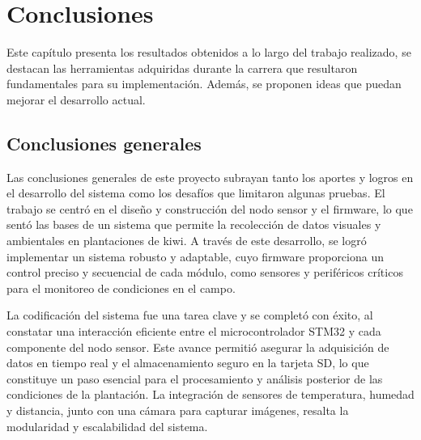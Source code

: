 
\chapter{Conclusiones} %

\label{Chapter5} %

Este capítulo presenta los resultados obtenidos a lo largo del trabajo realizado, se destacan las herramientas adquiridas durante la carrera que resultaron fundamentales para su implementación. Además, se proponen ideas que puedan mejorar el desarrollo actual.



\section{Conclusiones generales }

Las conclusiones generales de este proyecto subrayan tanto los aportes y logros en el desarrollo del sistema como los desafíos que limitaron algunas pruebas. El trabajo se centró en el diseño y construcción del nodo sensor y el firmware, lo que sentó las bases de un sistema que permite la recolección de datos visuales y ambientales en plantaciones de kiwi. A través de este desarrollo, se logró implementar un sistema robusto y adaptable, cuyo firmware proporciona un control preciso y secuencial de cada módulo, como sensores y periféricos críticos para el monitoreo de condiciones en el campo.

La codificación del sistema fue una tarea clave y se completó con éxito, al constatar una interacción eficiente entre el microcontrolador STM32 y cada componente del nodo sensor. Este avance permitió asegurar la adquisición de datos en tiempo real y el almacenamiento seguro en la tarjeta SD, lo que constituye un paso esencial para el procesamiento y análisis posterior de las condiciones de la plantación. La integración de sensores de temperatura, humedad y distancia, junto con una cámara para capturar imágenes, resalta la modularidad y escalabilidad del sistema. 


